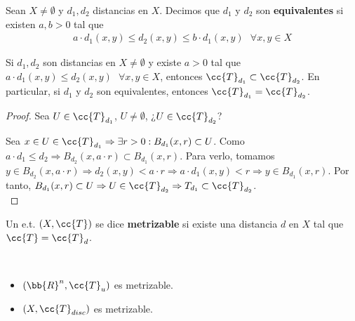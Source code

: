 \begin{definicion}
    Sean $X\neq \emptyset$ y $d_1, d_2$ distancias en $X$. Decimos que $d_1$ y $d_2$ son \textbf{equivalentes} si existen $a,b>0$ tal que 
    \begin{gather*}
        a \cdot d_1(x,y) \leq d_2(x,y) \leq b \cdot d_1(x,y) \ \ \ \forall x,y \in X
    \end{gather*}
    \endsquare
\end{definicion}

\begin{prop}
    Si $d_1, d_2$ son distancias en $X \neq \emptyset$ y existe $a>0$ tal que $a \cdot d_1(x,y) \leq d_2(x,y) \ \ \ \forall x,y \in X$, entonces $\cc{T}_{d_1} \subset \cc{T}_{d_2}$. En particular, si $d_1$ y $d_2$ son equivalentes, entonces $\cc{T}_{d_1} = \cc{T}_{d_2}$.


    \begin{proof}
        Sea $U\in \cc{T}_{d_1}$, $U \neq \emptyset$, ¿$U\in \cc{T}_{d_2}$?

        Sea $x \in U \in \cc{T}_{d_1} \Rightarrow \exists r>0: B_{d_1}(x,r)\subset U$. Como $a \cdot d_1 \leq d_2 \Rightarrow B_{d_2}(x,a\cdot r)\subset B_{d_1}(x,r)$. Para verlo, tomamos $y\in B_{d_2}(x,a\cdot r) \Rightarrow d_2(x,y)<a\cdot r \Rightarrow a \cdot d_1(x,y)<r \Rightarrow y \in B_{d_1}(x,r)$. Por tanto, $B_{d_1}(x,r)\subset U \Rightarrow U \in \cc{T}_{d_2}\Rightarrow T_{d_1}\subset \cc{T}_{d_2}$.\\
    \end{proof}
\end{prop}

\begin{definicion}
    Un e.t. $(X,\cc{T})$ se dice \textbf{metrizable} si existe una distancia $d$ en $X$ tal que $\cc{T}= \cc{T}_d$.
    \endsquare
\end{definicion}

\begin{ejemplo}\ 
    \begin{itemize}
        \item $(\bb{R}^n, \cc{T}_u)$ es metrizable.
        \item $(X, \cc{T}_{disc})$ es metrizable.
    \end{itemize}
    \endsquare
\end{ejemplo}

